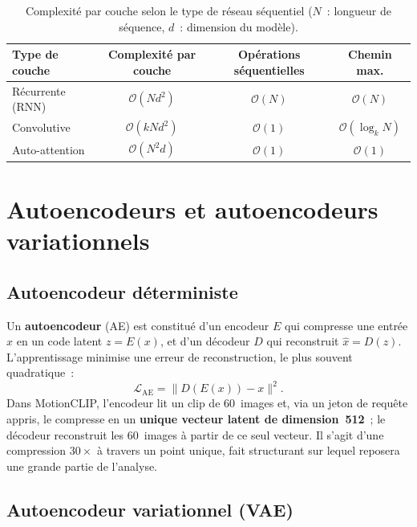 \documentclass[12pt,a4paper,oneside]{report}
\theoremstyle{definition}
\theoremstyle{plain}
\begin{document}
\begin{table}[ht]
\centering
\caption{Complexité par couche selon le type de réseau séquentiel ($N$~: longueur
de séquence, $d$~: dimension du modèle).}
\label{tab:complexite}
\small
\begin{tabular}{@{}lccc@{}}
\toprule
Type de couche & Complexité par couche & Opérations séquentielles & Chemin max. \\
\midrule
Récurrente (RNN) & $\mathcal{O}(N d^2)$ & $\mathcal{O}(N)$ & $\mathcal{O}(N)$ \\
Convolutive      & $\mathcal{O}(k N d^2)$ & $\mathcal{O}(1)$ & $\mathcal{O}(\log_k N)$ \\
Auto-attention   & $\mathcal{O}(N^2 d)$ & $\mathcal{O}(1)$ & $\mathcal{O}(1)$ \\
\bottomrule
\end{tabular}
\end{table}

\section{Autoencodeurs et autoencodeurs variationnels}
\label{sec:vae}

\subsection{Autoencodeur déterministe}

Un \textbf{autoencodeur} (AE) est constitué d'un encodeur $E$ qui compresse une
entrée $x$ en un code latent $z = E(x)$, et d'un décodeur $D$ qui reconstruit
$\hat{x} = D(z)$. L'apprentissage minimise une erreur de reconstruction, le plus
souvent quadratique~:
\begin{equation}
\mathcal{L}_{\text{AE}} = \lVert D(E(x)) - x\rVert^2 .
\end{equation}
Dans MotionCLIP, l'encodeur lit un clip de 60~images et, via un jeton de requête
appris, le compresse en un \textbf{unique vecteur latent de dimension~512}~; le
décodeur reconstruit les 60~images à partir de ce seul vecteur. Il s'agit d'une
compression $30\times$ à travers un point unique, fait structurant sur lequel
reposera une grande partie de l'analyse.

\subsection{Autoencodeur variationnel (VAE)}
\end{document}
